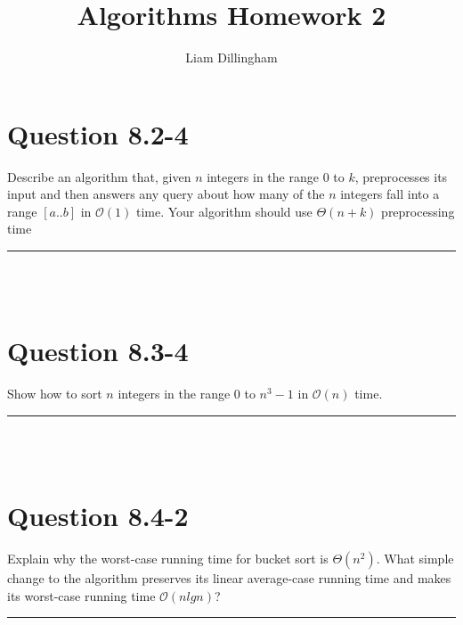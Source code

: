 \documentclass[20pt]{article} %
\title{Algorithms Homework 2}
\author{Liam Dillingham}
\begin{document}
\maketitle

\section{Question 8.2-4}
Describe an algorithm that, given $n$ integers in the range $0$ to $k$, preprocesses its input and then answers any query about how many of the $n$ integers fall into a range $[a..b]$ in $\mathcal{O}(1)$ time. Your algorithm should use $\Theta(n+k)$ preprocessing time \\ 
\noindent\rule{2cm}{0.4pt} \\ \\




\section{Question 8.3-4}
Show how to sort $n$ integers in the range $0$ to $n^{3} -1$ in $\mathcal{O}(n)$ time. \\ 
\noindent\rule{2cm}{0.4pt} \\ \\ 


\section{Question 8.4-2}
Explain why the worst-case running time for bucket sort is $\Theta(n^{2})$. What simple change to the algorithm preserves its linear average-case running time and makes its worst-case running time $\mathcal{O}(nlgn)$? \\ 
\noindent\rule{2cm}{0.4pt} \\ \\
\end{document}
